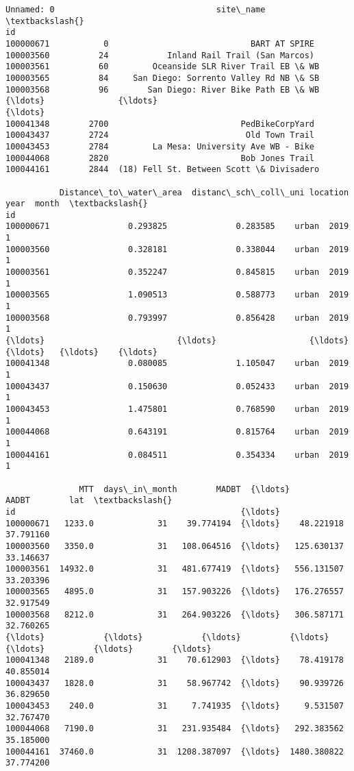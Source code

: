 \documentclass[11pt]{article}
\makeatletter
\newcommand{\boxspacing}{\kern\kvtcb@left@rule\kern\kvtcb@boxsep}
\newcommand{\prompt}[4]{
        {\ttfamily\llap{{\color{#2}[#3]:\hspace{3pt}#4}}\vspace{-\baselineskip}}
    }
\makeatother
\begin{document}
            \begin{tcolorbox}[breakable, size=fbox, boxrule=.5pt, pad at break*=1mm, opacityfill=0]
\prompt{Out}{outcolor}{12}{\boxspacing}
\begin{Verbatim}[commandchars=\\\{\}]
           Unnamed: 0                                 site\_name  \textbackslash{}
id
100000671           0                             BART AT SPIRE
100003560          24            Inland Rail Trail (San Marcos)
100003561          60         Oceanside SLR River Trail EB \& WB
100003565          84     San Diego: Sorrento Valley Rd NB \& SB
100003568          96        San Diego: River Bike Path EB \& WB
{\ldots}               {\ldots}                                       {\ldots}
100041348        2700                           PedBikeCorpYard
100043437        2724                            Old Town Trail
100043453        2784         La Mesa: University Ave WB - Bike
100044068        2820                           Bob Jones Trail
100044161        2844  (18) Fell St. Between Scott \& Divisadero

           Distance\_to\_water\_area  distanc\_sch\_coll\_uni location  year  month  \textbackslash{}
id
100000671                0.293825              0.283585    urban  2019      1
100003560                0.328181              0.338044    urban  2019      1
100003561                0.352247              0.845815    urban  2019      1
100003565                1.090513              0.588773    urban  2019      1
100003568                0.793997              0.856428    urban  2019      1
{\ldots}                           {\ldots}                   {\ldots}      {\ldots}   {\ldots}    {\ldots}
100041348                0.080085              1.105047    urban  2019      1
100043437                0.150630              0.052433    urban  2019      1
100043453                1.475801              0.768590    urban  2019      1
100044068                0.643191              0.815764    urban  2019      1
100044161                0.084511              0.354334    urban  2019      1

               MTT  days\_in\_month        MADBT  {\ldots}        AADBT        lat  \textbackslash{}
id                                              {\ldots}
100000671   1233.0             31    39.774194  {\ldots}    48.221918  37.791160
100003560   3350.0             31   108.064516  {\ldots}   125.630137  33.146637
100003561  14932.0             31   481.677419  {\ldots}   556.131507  33.203396
100003565   4895.0             31   157.903226  {\ldots}   176.276557  32.917549
100003568   8212.0             31   264.903226  {\ldots}   306.587171  32.760265
{\ldots}            {\ldots}            {\ldots}          {\ldots}  {\ldots}          {\ldots}        {\ldots}
100041348   2189.0             31    70.612903  {\ldots}    78.419178  40.855014
100043437   1828.0             31    58.967742  {\ldots}    90.939726  36.829650
100043453    240.0             31     7.741935  {\ldots}     9.531507  32.767470
100044068   7190.0             31   231.935484  {\ldots}   292.383562  35.185000
100044161  37460.0             31  1208.387097  {\ldots}  1480.380822  37.774200


\end{Verbatim}
\end{tcolorbox}
\end{document}
